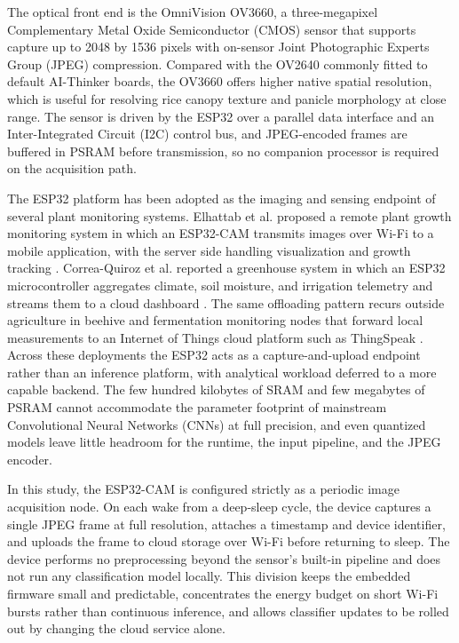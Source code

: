 The optical front end is the OmniVision OV3660, a three-megapixel Complementary Metal Oxide Semiconductor (CMOS) sensor that supports capture up to 2048 by 1536 pixels with on-sensor Joint Photographic Experts Group (JPEG) compression. Compared with the OV2640 commonly fitted to default AI-Thinker boards, the OV3660 offers higher native spatial resolution, which is useful for resolving rice canopy texture and panicle morphology at close range. The sensor is driven by the ESP32 over a parallel data interface and an Inter-Integrated Circuit (I2C) control bus, and JPEG-encoded frames are buffered in PSRAM before transmission, so no companion processor is required on the acquisition path.

The ESP32 platform has been adopted as the imaging and sensing endpoint of several plant monitoring systems. Elhattab et al. proposed a remote plant growth monitoring system in which an ESP32-CAM transmits images over Wi-Fi to a mobile application, with the server side handling visualization and growth tracking \cite{elhattab2023esp32cam}. Correa-Quiroz et al. reported a greenhouse system in which an ESP32 microcontroller aggregates climate, soil moisture, and irrigation telemetry and streams them to a cloud dashboard \cite{correaquiroz2025esp32greenhouse}. The same offloading pattern recurs outside agriculture in beehive and fermentation monitoring nodes that forward local measurements to an Internet of Things cloud platform such as ThingSpeak \cite{hercog2023esp32iot}. Across these deployments the ESP32 acts as a capture-and-upload endpoint rather than an inference platform, with analytical workload deferred to a more capable backend. The few hundred kilobytes of SRAM and few megabytes of PSRAM cannot accommodate the parameter footprint of mainstream Convolutional Neural Networks (CNNs) at full precision, and even quantized models leave little headroom for the runtime, the input pipeline, and the JPEG encoder.

In this study, the ESP32-CAM is configured strictly as a periodic image acquisition node. On each wake from a deep-sleep cycle, the device captures a single JPEG frame at full resolution, attaches a timestamp and device identifier, and uploads the frame to cloud storage over Wi-Fi before returning to sleep. The device performs no preprocessing beyond the sensor's built-in pipeline and does not run any classification model locally. This division keeps the embedded firmware small and predictable, concentrates the energy budget on short Wi-Fi bursts rather than continuous inference, and allows classifier updates to be rolled out by changing the cloud service alone.


